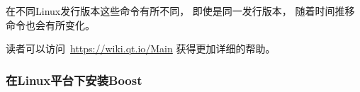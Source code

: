 在不同Linux发行版本这些命令有所不同，
即使是同一发行版本，
随着时间推移命令也会有所变化。

读者可以访问\ \url{https://wiki.qt.io/Main}
获得更加详细的帮助。




\subsubsection{
在Linux平台下安装Boost
}\label{ss000510}















